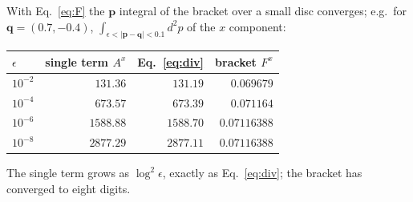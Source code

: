 \documentclass[11pt]{article}
\newcommand{\vq}{\mathbf{q}}
\newcommand{\vp}{\mathbf{p}}
\begin{document}
With Eq.~\eqref{eq:F} the $\vp$ integral of the bracket over a small disc converges; e.g.\ for $\vq=(0.7,-0.4)$, $\int_{\epsilon<|\vp-\vq|<0.1}d^{2}p$ of the $x$ component:
\begin{center}\begin{tabular}{lrrr}\toprule
$\epsilon$ & single term $A^{x}$ & Eq.~\eqref{eq:div} & bracket $F^{x}$\\\midrule
$10^{-2}$ & $131.36$ & $131.19$ & $0.069679$\\
$10^{-4}$ & $673.57$ & $673.39$ & $0.071164$\\
$10^{-6}$ & $1588.88$ & $1588.70$ & $0.07116388$\\
$10^{-8}$ & $2877.29$ & $2877.11$ & $0.07116388$\\\bottomrule
\end{tabular}\end{center}
The single term grows as $\log^{2}\epsilon$, exactly as Eq.~\eqref{eq:div}; the bracket has converged to eight digits.
\end{document}
